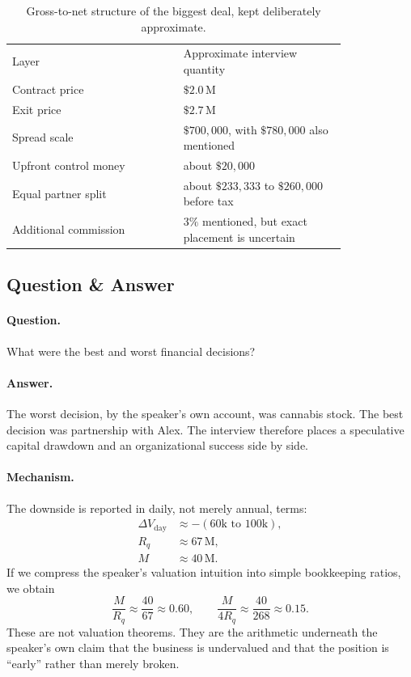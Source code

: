 \begin{table}[h]
\centering
\begin{tabular}{p{0.42\linewidth}p{0.40\linewidth}}
Layer & Approximate interview quantity \\
Contract price & \(\$2.0\,\mathrm{M}\) \\
Exit price & \(\$2.7\,\mathrm{M}\) \\
Spread scale & \(\$700{,}000\), with \(\$780{,}000\) also mentioned \\
Upfront control money & about \(\$20{,}000\) \\
Equal partner split & about \(\$233{,}333\) to \(\$260{,}000\) before tax \\
Additional commission & \(3\%\) mentioned, but exact placement is uncertain \\
\end{tabular}
\caption{Gross-to-net structure of the biggest deal, kept deliberately approximate.}
\end{table}

\subsection{Question \& Answer}

\paragraph{Question.}
What were the best and worst financial decisions?

\paragraph{Answer.}
The worst decision, by the speaker's own account, was cannabis stock. The best decision was partnership with Alex. The interview therefore places a speculative capital drawdown and an organizational success side by side.

\paragraph{Mechanism.}
The downside is reported in daily, not merely annual, terms:
\begin{align}
\Delta V_{\mathrm{day}} &\approx -(60\text{k to }100\text{k}),\\
R_q &\approx 67\,\mathrm{M},\\
M &\approx 40\,\mathrm{M}.
\end{align}
If we compress the speaker's valuation intuition into simple bookkeeping ratios, we obtain
\begin{equation}
\frac{M}{R_q} \approx \frac{40}{67} \approx 0.60,
\qquad
\frac{M}{4R_q} \approx \frac{40}{268} \approx 0.15.
\end{equation}
These are not valuation theorems. They are the arithmetic underneath the speaker's own claim that the business is undervalued and that the position is ``early'' rather than merely broken.

